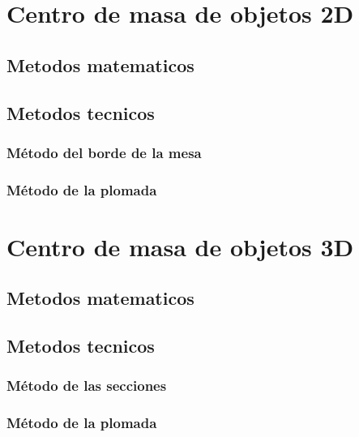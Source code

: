 \documentclass[
  16pt,
]{krantz}
\theoremstyle{definition}
\theoremstyle{definition}
\theoremstyle{definition}
\theoremstyle{definition}
\theoremstyle{remark}
\begin{document}
\hypertarget{centro-de-masa-de-objetos-2d}{%
\section{Centro de masa de objetos 2D}\label{centro-de-masa-de-objetos-2d}}

\hypertarget{metodos-matematicos}{%
\subsection{Metodos matematicos}\label{metodos-matematicos}}

\hypertarget{metodos-tecnicos}{%
\subsection{Metodos tecnicos}\label{metodos-tecnicos}}

\hypertarget{muxe9todo-del-borde-de-la-mesa}{%
\subsubsection{Método del borde de la mesa}\label{muxe9todo-del-borde-de-la-mesa}}

\hypertarget{muxe9todo-de-la-plomada}{%
\subsubsection{Método de la plomada}\label{muxe9todo-de-la-plomada}}

\hypertarget{centro-de-masa-de-objetos-3d}{%
\section{Centro de masa de objetos 3D}\label{centro-de-masa-de-objetos-3d}}

\hypertarget{metodos-matematicos-1}{%
\subsection{Metodos matematicos}\label{metodos-matematicos-1}}

\hypertarget{metodos-tecnicos-1}{%
\subsection{Metodos tecnicos}\label{metodos-tecnicos-1}}

\hypertarget{muxe9todo-de-las-secciones}{%
\subsubsection{Método de las secciones}\label{muxe9todo-de-las-secciones}}

\hypertarget{muxe9todo-de-la-plomada-1}{%
\subsubsection{Método de la plomada}\label{muxe9todo-de-la-plomada-1}}

  

\printindex
\end{document}
